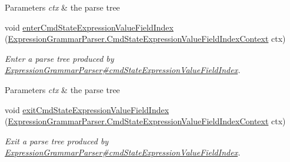 \begin{DoxyCompactItemize}
\begin{DoxyCompactList}
\begin{DoxyParams}{Parameters}
{\em ctx} & the parse tree\\
\hline
\end{DoxyParams}
 \end{DoxyCompactList}\item 
void \hyperlink{classgov_1_1nasa_1_1jpf_1_1inspector_1_1server_1_1expression_1_1parser_1_1_expression_grammar_base_listener_ada02f0e2a7cfd9528d0a66962f0fb4eb}{enter\+Cmd\+State\+Expression\+Value\+Field\+Index} (\hyperlink{classgov_1_1nasa_1_1jpf_1_1inspector_1_1server_1_1expression_1_1parser_1_1_expression_grammar_pa31d705710a4d9acddfdd67c37ac04c8a}{Expression\+Grammar\+Parser.\+Cmd\+State\+Expression\+Value\+Field\+Index\+Context} ctx)
\begin{DoxyCompactList}\small\item\em Enter a parse tree produced by \hyperlink{classgov_1_1nasa_1_1jpf_1_1inspector_1_1server_1_1expression_1_1parser_1_1_expression_grammar_parser_a300497ebff4ec0759e1a294e9d6a7920}{Expression\+Grammar\+Parser\#cmd\+State\+Expression\+Value\+Field\+Index}.


\begin{DoxyParams}{Parameters}
{\em ctx} & the parse tree\\
\hline
\end{DoxyParams}
 \end{DoxyCompactList}\item 
void \hyperlink{classgov_1_1nasa_1_1jpf_1_1inspector_1_1server_1_1expression_1_1parser_1_1_expression_grammar_base_listener_a8d33b7c160d61ede4ec9cee135533051}{exit\+Cmd\+State\+Expression\+Value\+Field\+Index} (\hyperlink{classgov_1_1nasa_1_1jpf_1_1inspector_1_1server_1_1expression_1_1parser_1_1_expression_grammar_pa31d705710a4d9acddfdd67c37ac04c8a}{Expression\+Grammar\+Parser.\+Cmd\+State\+Expression\+Value\+Field\+Index\+Context} ctx)
\begin{DoxyCompactList}\small\item\em Exit a parse tree produced by \hyperlink{classgov_1_1nasa_1_1jpf_1_1inspector_1_1server_1_1expression_1_1parser_1_1_expression_grammar_parser_a300497ebff4ec0759e1a294e9d6a7920}{Expression\+Grammar\+Parser\#cmd\+State\+Expression\+Value\+Field\+Index}.



\end{DoxyCompactList}
\end{DoxyCompactItemize}
